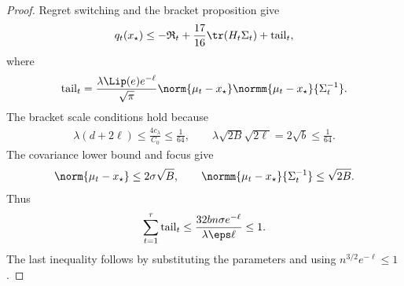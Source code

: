 \begin{proof}
    Regret switching and the bracket proposition give
    \begin{align}
        q_t(x_\star)
        \leq
        -\mathfrak R_t
        +\frac{17}{16}\tr(H_t\Sigma_t)
        +\operatorname{tail}_t,
        \label{eq:ctr-q-inward}
    \end{align}
    where
    \begin{align}
        \operatorname{tail}_t
        =\frac{\lambda\Lip(e)e^{-\ell}}{\sqrt\pi}
        \norm{\mu_t-x_\star}
        \normm{\mu_t-x_\star}{\Sigma_t^{-1}}.
    \end{align}
    The bracket scale conditions hold because
    \begin{align}
        \lambda(d+2\ell)
        \leq\frac{4c_\lambda}{C_0}\leq\frac1{64},
        \qquad
        \lambda\sqrt{2B}\sqrt{2\ell}
        =2\sqrt b\leq\frac1{64}.
    \end{align}
    The covariance lower bound and focus give
    \begin{align}
        \norm{\mu_t-x_\star}\leq2\sigma\sqrt B,
        \qquad
        \normm{\mu_t-x_\star}{\Sigma_t^{-1}}\leq\sqrt{2B}.
    \end{align}
    Thus
    \begin{align}
        \sum_{t=1}^{\tau}\operatorname{tail}_t
        \leq
        \frac{32bn\sigma e^{-\ell}}{\lambda\eps\ell}
        \leq1.
        \label{eq:ctr-bracket-tail-sum}
    \end{align}
    The last inequality follows by substituting the parameters and using
    $n^{3/2}e^{-\ell}\leq1$.


\end{proof}
